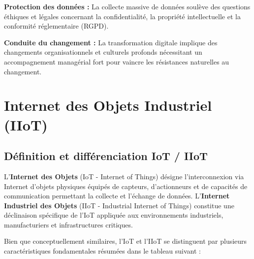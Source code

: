 \textbf{Protection des données :} La collecte massive de données soulève des questions éthiques et légales concernant la confidentialité, la propriété intellectuelle et la conformité réglementaire (RGPD).

\textbf{Conduite du changement :} La transformation digitale implique des changements organisationnels et culturels profonds nécessitant un accompagnement managérial fort pour vaincre les résistances naturelles au changement.

\section{Internet des Objets Industriel (IIoT)}

\subsection{Définition et différenciation IoT / IIoT}

L'\textbf{Internet des Objets} (IoT - Internet of Things) désigne l'interconnexion via Internet d'objets physiques équipés de capteurs, d'actionneurs et de capacités de communication permettant la collecte et l'échange de données. L'\textbf{Internet Industriel des Objets} (IIoT - Industrial Internet of Things) constitue une déclinaison spécifique de l'IoT appliquée aux environnements industriels, manufacturiers et infrastructures critiques.

Bien que conceptuellement similaires, l'IoT et l'IIoT se distinguent par plusieurs caractéristiques fondamentales résumées dans le tableau suivant :

